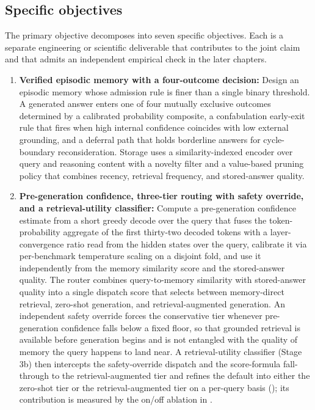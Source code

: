 \subsection{Specific objectives}
\label{sec:specific-objectives}

The primary objective decomposes into seven specific objectives. Each is a separate engineering or scientific deliverable that contributes to the joint claim and that admits an independent empirical check in the later chapters.

\begin{enumerate}
\item \textbf{Verified episodic memory with a four-outcome decision:} Design an episodic memory whose admission rule is finer than a single binary threshold. A generated answer enters one of four mutually exclusive outcomes determined by a calibrated probability composite, a confabulation early-exit rule that fires when high internal confidence coincides with low external grounding, and a deferral path that holds borderline answers for cycle-boundary reconsideration. Storage uses a similarity-indexed encoder over query and reasoning content with a novelty filter and a value-based pruning policy that combines recency, retrieval frequency, and stored-answer quality.

\item \textbf{Pre-generation confidence, three-tier routing with safety override, and a retrieval-utility classifier:} Compute a pre-generation confidence estimate from a short greedy decode over the query that fuses the token-probability aggregate of the first thirty-two decoded tokens with a layer-convergence ratio read from the hidden states over the query, calibrate it via per-benchmark temperature scaling on a disjoint fold, and use it independently from the memory similarity score and the stored-answer quality. The router combines query-to-memory similarity with stored-answer quality into a single dispatch score that selects between memory-direct retrieval, zero-shot generation, and retrieval-augmented generation. An independent safety override forces the conservative tier whenever pre-generation confidence falls below a fixed floor, so that grounded retrieval is available before generation begins and is not entangled with the quality of memory the query happens to land near. A retrieval-utility classifier (Stage 3b) then intercepts the safety-override dispatch and the score-formula fall-through to the retrieval-augmented tier and refines the default into either the zero-shot tier or the retrieval-augmented tier on a per-query basis (); its contribution is measured by the on/off ablation in .


\end{enumerate}
